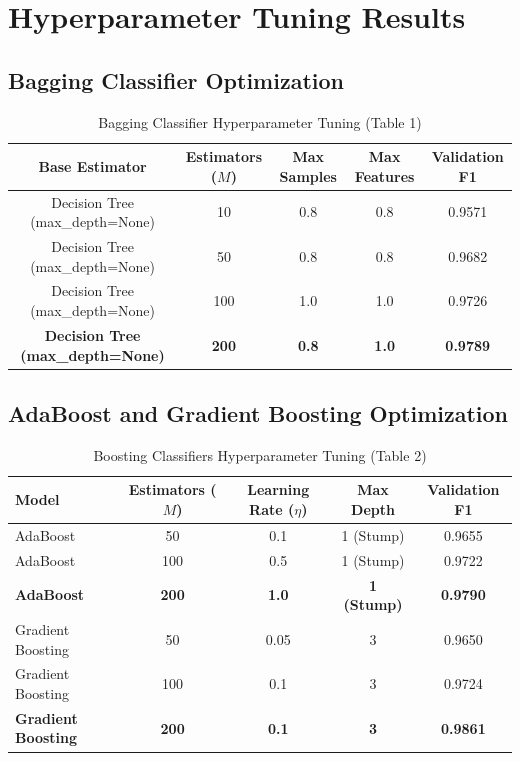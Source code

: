 \documentclass[12pt,a4paper]{article}
\begin{document}
\section{Hyperparameter Tuning Results}

\subsection{Bagging Classifier Optimization}
\begin{table}[H]
\centering
\caption{Bagging Classifier Hyperparameter Tuning (Table 1)}
\label{tab:bagging_tuning}
\begin{tabular}{|c|c|c|c|c|}
\hline
\textbf{Base Estimator} & \textbf{Estimators ($M$)} & \textbf{Max Samples} & \textbf{Max Features} & \textbf{Validation F1}\\ \hline
Decision Tree (max\_depth=None) & 10 & 0.8 & 0.8 & 0.9571\\ \hline
Decision Tree (max\_depth=None) & 50 & 0.8 & 0.8 & 0.9682\\ \hline
Decision Tree (max\_depth=None) & 100 & 1.0 & 1.0 & 0.9726\\ \hline
\textbf{Decision Tree (max\_depth=None)} & \textbf{200} & \textbf{0.8} & \textbf{1.0} & \textbf{0.9789}\\ \hline
\end{tabular}
\end{table}

\subsection{AdaBoost and Gradient Boosting Optimization}
\begin{table}[H]
\centering
\caption{Boosting Classifiers Hyperparameter Tuning (Table 2)}
\label{tab:boosting_tuning}
\begin{tabular}{|l|c|c|c|c|}
\hline
\textbf{Model} & \textbf{Estimators ($M$)} & \textbf{Learning Rate ($\eta$)} & \textbf{Max Depth} & \textbf{Validation F1}\\ \hline
AdaBoost & 50 & 0.1 & 1 (Stump) & 0.9655\\ \hline
AdaBoost & 100 & 0.5 & 1 (Stump) & 0.9722\\ \hline
\textbf{AdaBoost} & \textbf{200} & \textbf{1.0} & \textbf{1 (Stump)} & \textbf{0.9790}\\ \hline
Gradient Boosting & 50 & 0.05 & 3 & 0.9650\\ \hline
Gradient Boosting & 100 & 0.1 & 3 & 0.9724\\ \hline
\textbf{Gradient Boosting} & \textbf{200} & \textbf{0.1} & \textbf{3} & \textbf{0.9861}\\ \hline
\end{tabular}
\end{table}
\end{document}
